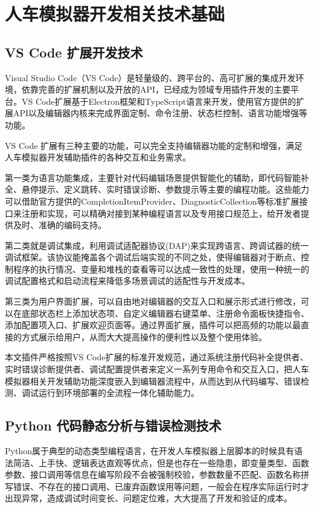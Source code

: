 
\chapter{人车模拟器开发相关技术基础}

\section{VS Code 扩展开发技术}

Visual Studio Code（VS
Code）是轻量级的、跨平台的、高可扩展的集成开发环境，依靠完善的扩展机制以及开放的API，已经成为领域专用插件开发的主要平台。VS
Code扩展基于Electron框架和TypeScript语言来开发，使用官方提供的扩展API以及编辑器内核来完成界面定制、命令注册、状态栏控制、语言功能增强等功能。

VS Code
扩展有三种主要的功能，可以完全支持编辑器功能的定制和增强，满足人车模拟器开发辅助插件的各种交互和业务需求。

第一类为语言功能集成，主要针对代码编辑场景提供智能化的辅助，即代码智能补全、悬停提示、定义跳转、实时错误诊断、参数提示等主要的编程功能。这些能力可以借助官方提供的CompletionItemProvider、DiagnosticCollection等标准扩展接口来注册和实现，可以精确对接到某种编程语言以及专用接口规范上，给开发者提供及时、准确的编码支持。

第二类就是调试集成，利用调试适配器协议(DAP)来实现跨语言、跨调试器的统一调试框架。该协议能掩盖各个调试后端实现的不同之处，使得编辑器对于断点、控制程序的执行情况、变量和堆栈的查看等可以达成一致性的处理，使用一种统一的调试配置格式和启动流程来降低多场景调试的适配性与开发成本。

第三类为用户界面扩展，可以自由地对编辑器的交互入口和展示形式进行修改，可以在底部状态栏上添加状态项、自定义编辑器右键菜单、注册命令面板快捷指令、添加配置项入口、扩展欢迎页面等。通过界面扩展，插件可以把高频的功能以最直接的方式展示给用户，从而大大提高操作的便利性以及整个使用体验。

本文插件严格按照VS
Code扩展的标准开发规范，通过系统注册代码补全提供者、实时错误诊断提供者、调试配置提供者来定义一系列专用命令和交互入口，把人车模拟器相关开发辅助功能深度嵌入到编辑器流程中，从而达到从代码编写、错误检测、调试运行到环境部署的全流程一体化辅助能力。

\section{Python 代码静态分析与错误检测技术}

Python属于典型的动态类型编程语言，在开发人车模拟器上层脚本的时候具有语法简洁、上手快、逻辑表达直观等优点，但是也存在一些隐患，即变量类型、函数参数、接口调用等信息在编写阶段不会被强制校验，参数数量不匹配、函数名称拼写错误、不存在的接口调用、已废弃函数误用等问题，一般会在程序实际运行时才出现异常，造成调试时间变长、问题定位难，大大提高了开发和验证的成本。

